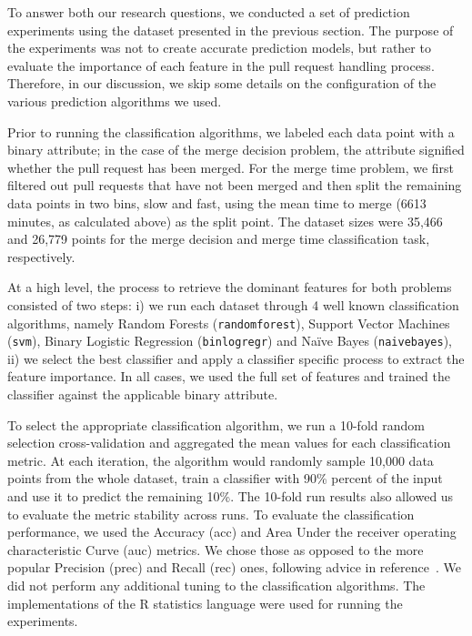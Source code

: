 \documentclass{sig-alternate}
\begin{document}
To answer both our research questions, we conducted a set of prediction
experiments using the dataset presented in the previous section.
The purpose of the experiments was not to create accurate prediction
models, but rather to evaluate the importance of each feature
in the pull request handling process. Therefore, in our discussion, 
we skip some details on the configuration of the various
prediction algorithms we used.

Prior to running the classification algorithms, we labeled each data point with
a binary attribute; in the case of the merge decision problem, the attribute
signified whether the pull request has been merged. For the merge time problem,
we first filtered out pull requests that have not been merged and then split
the remaining data points in two bins, slow and fast, using the mean time to
merge (6613 minutes, as calculated above) as the split point. The dataset
sizes were 35,466 and 26,779 points for the merge decision and merge time
classification task, respectively.

At a high level, the process to retrieve the dominant features for both
problems consisted of two steps: i) we run each dataset through 4 well known
classification algorithms, namely Random Forests (\texttt{randomforest}),
Support Vector Machines (\texttt{svm}), Binary Logistic Regression
(\texttt{binlogregr}) and Na\"ive Bayes (\texttt{naivebayes}), ii) we select
the best classifier and apply a classifier specific process to extract the
feature importance. In all cases, we used the full set of features and
trained the classifier against the applicable binary attribute.

To select the appropriate classification algorithm, we run a 10-fold random
selection cross-validation and aggregated the mean values for each
classification metric. At each iteration, the algorithm would randomly sample
10,000 data points from the whole dataset, train a classifier with 90\% percent
of the input and use it to predict the remaining 10\%. The 10-fold run results
also allowed us to evaluate the metric stability across runs. To evaluate the
classification performance, we used the Accuracy ({\sc acc}) and Area Under the
receiver operating characteristic Curve ({\sc auc}) metrics. We chose those as
opposed to the more popular Precision ({\sc prec}) and Recall ({\sc rec}) ones,
following advice in reference~\cite{Lessm08}. We did not perform any additional
tuning to the classification algorithms. The implementations of the R
statistics language were used for running the experiments.
\end{document}
